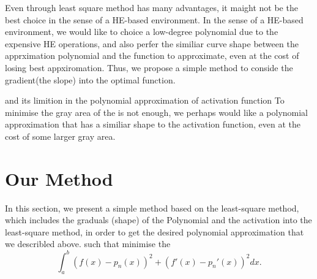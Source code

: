 \documentclass{article}
\theoremstyle{definition}
\begin{document}
Even through least square method has many advantages, it maight not be the best choice in the sense of a HE-based environment. In the sense of a HE-based environment, we would like to choice a low-degree polynomial due to the expensive HE operations, and also perfer the similiar curve shape between the apprximation polynomial and the function to approximate, even at the cost of losing best appxiromation. Thus, we propose a simple method to conside the gradient(the slope) into the optimal function.  

and its limition in the polynomial approximation of activation function
To minimise the gray area of the is not enough, we perhaps would like a polynomial approximation that has a similiar shape to the activation function, even at the cost of some larger gray area. 

\section{Our Method}
\label{sec:others}

In this section, we present  a simple method based on the least-square method, which  includes  the graduals (shape) of the Polynomial and the activation into  the least-square method, in order to get the desired polynomial approximation that we describled above.
such that  minimise the 
$$\int_{a}^{b} (f(x) - p_n(x))^2 + (f'(x) - p_n'(x))^2 dx. $$
\end{document}
